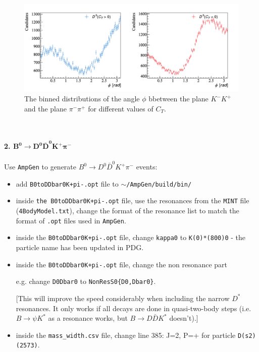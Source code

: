 \begin{figure}[h]
\center
\includegraphics*[width=0.96\linewidth]{CM_variables_D0/planeangleD0}
\caption{The binned distributions of the angle $\phi$ bbetween the plane $K^-K^+$ and the plane $\pi^-\pi^+$ for different values of $C_T$.}
\label{phiD}
\end{figure}
\clearpage
\\
\\
\noindent \textbf{2. $\bm{B^0\to D^0\bar{D}^0K^+\pi^-}$}
\\
\\
Use \texttt{AmpGen} to generate $B^0\to D^0\bar{D}^0K^+\pi^-$ events:
\begin{itemize}
    \item add \texttt{B0toDDbar0K+pi-.opt} file to \texttt{$\sim$/AmpGen/build/bin/}
    \item inside \texttt{the B0toDDbar0K+pi-.opt} file, use the resonances from the \texttt{MINT} file (\texttt{4BodyModel.txt}), change the format of the resonance list to match the format of \texttt{.opt} files used in \texttt{AmpGen}.
    \item inside the \texttt{B0toDDbar0K+pi-.opt} file, change \texttt{kappa0} to \texttt{K(0)*(800)0} - the particle name has been updated in PDG.
    \item inside the \texttt{B0toDDbar0K+pi-.opt} file, change the non resonance part
    
    e.g. change \texttt{D0Dbar0} to \texttt{NonResS0\{D0,Dbar0\}}.
    
    [This will improve the speed considerably when including the narrow $D^*$ resonances. It only works if all decays are done in quasi-two-body steps (i.e. $B\to\psi K^*$ as a resonance works, but $B\to D\bar{D}K^*$ doesn’t).]
    \item inside the \texttt{mass\_width.csv} file, change line 385: J=2, P=+ for particle \texttt{D(s2)(2573)}.
\end{itemize}
\\
\\
